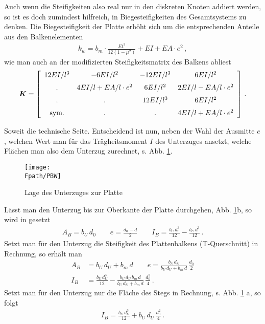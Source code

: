 Auch wenn die Steifigkeiten also real nur in den diskreten Knoten addiert werden, so ist es doch zumindest hilfreich, in Biegesteifigkeiten des Gesamtsystems zu denken. Die Biegesteifigkeit der Platte erh\"{o}ht sich um die entsprechenden Anteile aus den Balkenelementen
\begin{align}
k_w = b_m \cdot \frac{Et^3}{12(1-\mu^2)} + {EI} + {EA} \cdot e^2\,,
\end{align}
wie man auch an der modifizierten Steifigkeitsmatrix des Balkens abliest
\begin{eqnarray*}
\mbox{\boldmath $K$}= \left[\begin{array}{c c c c} 12EI/l^3 &
-6EI/l^2 & -12EI/l^3 & 6EI/l^2\\[0.2cm] .
& 4EI/l+ EA/l \cdot e^2 & 6EI/l^2 &
2EI /l- EA/l \cdot e^2\\[0.2cm] . & . &
12EI/l^3 & 6EI/l^2\\[0.2cm] \mbox{sym.} & . & . &
4EI/l + EA/l \cdot e^2
\end{array}\right]\,.
\end{eqnarray*}

Soweit die technische Seite. Entscheidend ist nun, neben der Wahl der Ausmitte $e$, welchen Wert man f\"{u}r das Tr\"{a}gheitsmoment $I$ des Unterzuges ansetzt, welche Fl\"{a}chen man also dem Unterzug zurechnet, s. Abb. \ref{PWB}.
\begin{figure}[tbp]
\centering
\if {} \sidecaption \fi
\texttt{[image: \\Fpath/PBW]}
\caption{Lage des Unterzuges zur Platte} \label{PWB}
\end{figure}%

L\"{a}sst man den Unterzug bis zur Oberkante der Platte durchgehen, Abb. \ref{PWB}b, so wird
in \cite{Wu1} gesetzt
\begin{align}
A_B = b_U \,d_0 \qquad e = \frac{d_0 - d}{2} \qquad I_B =
\frac{b_U \,d_0^3}{12}- \frac{b_U\,d^3}{12}\,.
\end{align}
Setzt man f\"{u}r den Unterzug die
Steifigkeit des Plattenbalkens (T-Querschnitt) in Rechnung, so erh\"{a}lt man
\begin{align}
A_B &=
b_U\,d_U + b_m\,d \qquad e = \frac{b_U\,d_U}{b_U\,d_U +
b_m\,d}\,\frac{d_0}{2} \\
I_B &=\frac{b_U \,d_U^3}{12}- \frac{b_U\,d_U\,b_m\,d}{b_U\,d_U +
b_m\,d}\,\frac{d_0^2}{4}\,.
\end{align}
Setzt man f\"{u}r den Unterzug nur die Fl\"{a}che des Stegs in
Rechnung, s. Abb. \ref{PWB} a, so folgt
\begin{align}
I_B =\frac{b_U \,d_U^3}{12} + b_U\,d_U \,\frac{d_0^2}{4}\,.
\end{align}

